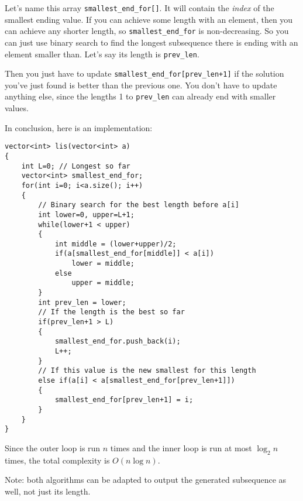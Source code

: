 Let's name this array \texttt{smallest\_end\_for[]}.
It will contain the \emph{index} of the smallest ending value.
If you can achieve some length with an element, then you can achieve
any shorter length, so \texttt{smallest\_end\_for} is non-decreasing.
So you can just use binary search to find the longest subsequence
there is ending with an element smaller than. Let's say its length is
\texttt{prev\_len}.

Then you just have to update \texttt{smallest\_end\_for[prev\_len+1]}
if the solution you've just found is better than the previous one.
You don't have to update anything else, since the lengths 1 to
\texttt{prev\_len}
can already end with smaller values.

In conclusion, here is an implementation:
\begin{verbatim}
vector<int> lis(vector<int> a)
{
    int L=0; // Longest so far
    vector<int> smallest_end_for;
    for(int i=0; i<a.size(); i++)
    {
        // Binary search for the best length before a[i]
        int lower=0, upper=L+1;
        while(lower+1 < upper)
        {
            int middle = (lower+upper)/2;
            if(a[smallest_end_for[middle]] < a[i])
                lower = middle;
            else
                upper = middle;
        }
        int prev_len = lower;
        // If the length is the best so far
        if(prev_len+1 > L)
        {
            smallest_end_for.push_back(i);
            L++;
        }
        // If this value is the new smallest for this length
        else if(a[i] < a[smallest_end_for[prev_len+1]])
        {
            smallest_end_for[prev_len+1] = i;
        }
    }
}
\end{verbatim}

Since the outer loop is run $n$ times and the inner loop is run
at most $\log_2 n$ times, the total complexity is $O(n\log n)$.

Note: both algorithms can be adapted to output the generated
subsequence as well, not just its length.
